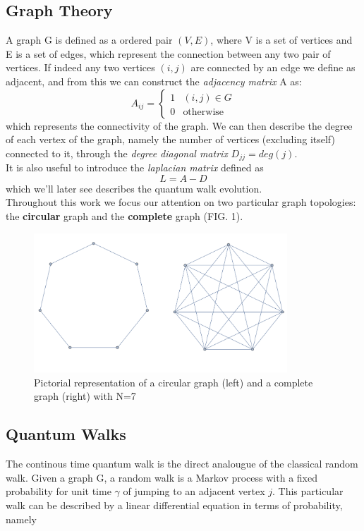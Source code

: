 \documentclass[aps,pra,reprint, onecolumn, showkeys]{revtex4-2}
\begin{document}
\subsection{Graph Theory}
A graph G is defined as a ordered pair $(V,E)$, where V is a set of vertices and E is a set of edges, which represent the connection between any two pair of vertices. If indeed any two vertices $(i,j)$ are connected by an edge we define as adjacent, and from this we can construct the \textit{adjacency matrix} A as:
\begin{equation}
A_{ij} = \begin{cases} 1 & (i,j)\in G \\ 0 & \mbox{otherwise} \end{cases}
\end{equation}
which represents the connectivity of the graph. We can then describe the degree of each vertex of the graph, namely the number of vertices (excluding itself) connected to it, through the \textit{degree diagonal matrix} $D_{jj} = deg(j)$.\\
It is also useful to introduce the \textit{laplacian matrix} defined as
\begin{equation}
  L = A-D
\end{equation}
which we'll later see describes the quantum walk evolution.\\

Throughout this work we focus our attention on two particular graph topologies: the \textbf{circular} graph and the \textbf{complete} graph (FIG. 1).


\begin{figure}[ht]
\includegraphics[width=9.5cm]{./figures/graph.png}%
\caption{Pictorial representation of a circular graph (left) and a complete graph (right) with N=7}
\end{figure}

\subsection{Quantum Walks}
The continous time quantum walk is the direct analougue of the classical random walk. Given a graph G, a random walk is a Markov process with a fixed probability for unit time $\gamma$ of jumping to an adjacent vertex $j$. This particular walk can be described by a linear differential equation in terms of probability, namely
\end{document}
